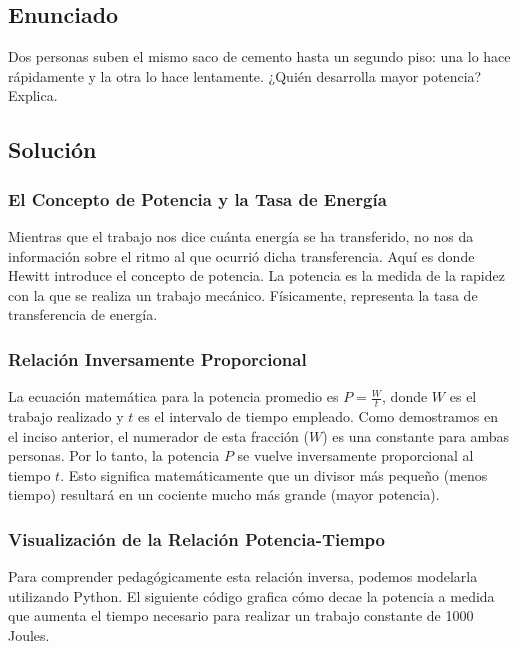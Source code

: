 \documentclass[a4paper,12pt]{article}
\begin{document}
\newpage
\subsection*{Enunciado}
Dos personas suben el mismo saco de cemento hasta un segundo piso: una lo hace rápidamente y la otra lo hace lentamente.
¿Quién desarrolla mayor potencia? Explica.

\subsection*{Solución}

\subsubsection*{El Concepto de Potencia y la Tasa de Energía}
Mientras que el trabajo nos dice cuánta energía se ha transferido, no nos da información sobre el ritmo al que ocurrió dicha transferencia. Aquí es donde Hewitt introduce el concepto de potencia. La potencia es la medida de la rapidez con la que se realiza un trabajo mecánico. Físicamente, representa la tasa de transferencia de energía.

\subsubsection*{Relación Inversamente Proporcional}
La ecuación matemática para la potencia promedio es $P = \frac{W}{t}$, donde $W$ es el trabajo realizado y $t$ es el intervalo de tiempo empleado. Como demostramos en el inciso anterior, el numerador de esta fracción ($W$) es una constante para ambas personas. Por lo tanto, la potencia $P$ se vuelve inversamente proporcional al tiempo $t$. Esto significa matemáticamente que un divisor más pequeño (menos tiempo) resultará en un cociente mucho más grande (mayor potencia).

\subsubsection*{Visualización de la Relación Potencia-Tiempo}
Para comprender pedagógicamente esta relación inversa, podemos modelarla utilizando Python. El siguiente código grafica cómo decae la potencia a medida que aumenta el tiempo necesario para realizar un trabajo constante de 1000 Joules.
\end{document}
